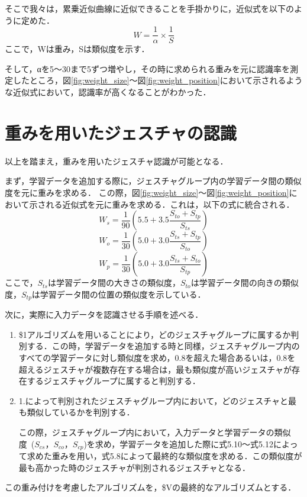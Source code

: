 そこで我々は，累乗近似曲線に近似できることを手掛かりに，近似式を以下のように定めた．\begin{equation}
W = \frac{1}{α} \times \frac{1}{S} 
\end{equation}
ここで，Wは重み，Sは類似度を示す．

そして，αを5〜30まで5ずつ増やし，その時に求められる重みを元に認識率を測定したところ，図\ref{fig:weight_size}〜図\ref{fig:weight_position}において示されるような近似式において，認識率が高くなることがわかった．

\clearpage
\section{重みを用いたジェスチャの認識}
以上を踏まえ，重みを用いたジェスチャ認識が可能となる．

まず，学習データを追加する際に，ジェスチャグループ内の学習データ間の類似度を元に重みを求める．
この際，図\ref{fig:weight_size}〜図\ref{fig:weight_position}において示される近似式を元に重みを求める．これは，以下の式に統合される．
\begin{equation}
W_\textit{s} = \frac{1}{90}(5.5 + 3.5\frac{S_\textit{to} + S_\textit{tp}}{S_\textit{ts}})
\end{equation}
\begin{equation}
W_\textit{o} = \frac{1}{30}(5.0 + 3.0\frac{S_\textit{ts} + S_\textit{tp}}{S_\textit{to}})
\end{equation}
\begin{equation}
W_\textit{p} = \frac{1}{30}(5.0 + 3.0\frac{S_\textit{ts} + S_\textit{to}}{S_\textit{tp}})
\end{equation}
ここで，$S_\textit{ts}$は学習データ間の大きさの類似度，$S_\textit{to}$は学習データ間の向きの類似度，$S_\textit{tp}$は学習データ間の位置の類似度を示している．


次に，実際に入力データを認識させる手順を述べる．
\begin{enumerate}
\item \$1アルゴリズムを用いることにより，どのジェスチャグループに属するか判別する．この時，学習データを追加する時と同様，ジェスチャグループ内のすべての学習データに対し類似度を求め，0.8を超えた場合あるいは，0.8を超えるジェスチャが複数存在する場合は，最も類似度が高いジェスチャが存在するジェスチャグループに属すると判別する．
\item 1.によって判別されたジェスチャグループ内において，どのジェスチャと最も類似しているかを判別する．

この際，ジェスチャグループ内において，入力データと学習データの類似度~($S_\textit{cs}$，$S_\textit{co}$，$S_\textit{cp}$)を求め，学習データを追加した際に式5.10〜式5.12によって求めた重みを用い，式5.8によって最終的な類似度を求める．この類似度が最も高かった時のジェスチャが判別されるジェスチャとなる．

\end{enumerate}

この重み付けを考慮したアルゴリズムを，\$Vの最終的なアルゴリズムとする．






